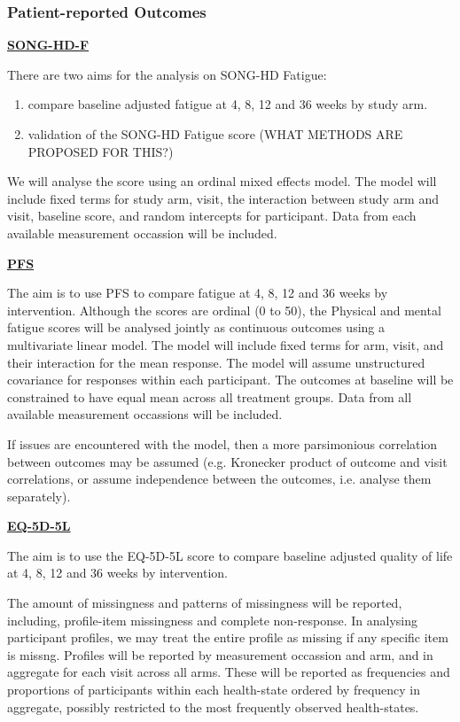 \documentclass[11pt,parskip=half-]{scrartcl}
\providecommand{\tightlist}{%
  \setlength{\itemsep}{0pt}\setlength{\parskip}{0pt}}
\begin{document}
\subsubsection{Patient-reported Outcomes}\label{patient-reported-outcomes}

\label{analysis:song-hd-f}
\hyperref[outcome:song-hd-f]{\textbf{SONG-HD-F}}

There are two aims for the analysis on SONG-HD Fatigue:

\begin{enumerate}
  \tightlist
  \item compare baseline adjusted fatigue at 4, 8, 12 and 36 weeks by study arm.
  \item validation of the SONG-HD Fatigue score (WHAT METHODS ARE PROPOSED FOR THIS?)
\end{enumerate}

We will analyse the score using an ordinal mixed effects model. The model will include fixed terms for study arm, visit, the interaction between study arm and visit, baseline score, and random intercepts for participant. Data from each available measurement occassion will be included.

\label{analysis:pfs}
\hyperref[outcome:pfs]{\textbf{PFS}}

The aim is to use PFS to compare fatigue at 4, 8, 12 and 36 weeks by intervention. Although the scores are ordinal (0 to 50), the Physical and mental fatigue scores will be analysed jointly as continuous outcomes using a multivariate linear model. The model will include fixed terms for arm, visit, and their interaction for the mean response. The model will assume unstructured covariance for responses within each participant. The outcomes at baseline will be constrained to have equal mean across all treatment groups. Data from all available measurement occassions will be included.

If issues are encountered with the model, then a more parsimonious correlation between outcomes may be assumed (e.g. Kronecker product of outcome and visit correlations, or assume independence between the outcomes, i.e. analyse them separately).

\label{analysis:eq5d5l}
\hyperref[outcome:eq5d5l]{\textbf{EQ-5D-5L}}

The aim is to use the EQ-5D-5L score to compare baseline adjusted quality of life at 4, 8, 12 and 36 weeks by intervention.

The amount of missingness and patterns of missingness will be reported, including, profile-item missingness and complete non-response. In analysing participant profiles, we may treat the entire profile as missing if any specific item is missng. Profiles will be reported by measurement occassion and arm, and in aggregate for each visit across all arms. These will be reported as frequencies and proportions of participants within each health-state ordered by frequency in aggregate, possibly restricted to the most frequently observed health-states.
\end{document}
